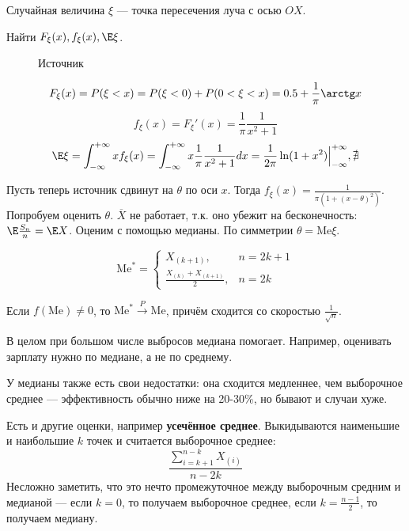 Случайная величина \(\xi\) --- точка пересечения луча с осью \(OX\).

Найти \(F_\xi(x), f_\xi(x), \E \xi\).

\begin{figure}[h]
    \centering
    \caption{Источник}
\end{figure}

\[F_\xi(x) = P(\xi < x) = P(\xi < 0) + P(0 < \xi < x) = 0.5 + \frac{1}{\pi} \arctg x\]
\[f_\xi(x) = F_\xi'(x) = \frac{1}{\pi} \frac{1}{x^2 + 1}\]
\[\E \xi = \int_{ - \infty }^{ + \infty } x f_\xi(x) = \int_{ - \infty }^{ + \infty } x \frac{1}{\pi} \frac{1}{x^2 + 1} dx = \frac{1}{2 \pi} \ln(1 + x^2) \Big|_{ - \infty }^{ + \infty}, \nexists\]

Пусть теперь источник сдвинут на \(\theta\) по оси \(x\). Тогда \(f_\xi(x) = \frac{1}{\pi (1 + (x - \theta)^2)}\). Попробуем оценить \(\theta\). \(\overline{X}\) не работает, т.к. оно убежит на бесконечность: \(\E \frac{S_n}{n} = \E X\). Оценим с помощью медианы. По симметрии \(\theta = \mathrm{Me} \xi\).

\[\mathrm{Me}^* = \begin{cases}
        X_{(k + 1)},                     & n = 2k + 1 \\
        \frac{X_{(k)} + X_{(k + 1)}}{2}, & n = 2k
    \end{cases}\]

\begin{theorem}
    Если \(f(\mathrm{Me}) \neq 0\), то \(\mathrm{Me}^* \xrightarrow{P} \mathrm{Me}\), причём сходится со скоростью \(\frac{1}{\sqrt{n}}\).
\end{theorem}

В целом при большом числе выбросов медиана помогает. Например, оценивать зарплату нужно по медиане, а не по среднему.

У медианы также есть свои недостатки: она сходится медленнее, чем выборочное среднее --- эффективность обычно ниже на 20-30\%, но бывают и случаи хуже.

Есть и другие оценки, например \textbf{усечённое среднее}. Выкидываются наименьшие и наибольшие \(k\) точек и считается выборочное среднее:
\[\frac{\sum\limits_{i= k + 1}^{n - k} X_{(i)}}{n - 2k}\]
Несложно заметить, что это нечто промежуточное между выборочным средним и медианой --- если \(k = 0\), то получаем выборочное среднее, если \(k = \frac{n - 1}{2}\), то получаем медиану.

